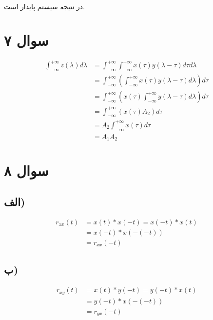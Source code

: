 \documentclass{article}
\begin{document}
	در نتیجه سیستم پایدار است.

	\section*{سوال ۷}

	\begin{align*}
		\int_{-\infty}^{+\infty} z(\lambda) d\lambda
		&= \int_{-\infty}^{+\infty} \int_{-\infty}^{+\infty} x(\tau) y(\lambda - \tau) d\tau d\lambda \\
		&= \int_{-\infty}^{+\infty} \left(\int_{-\infty}^{+\infty} x(\tau) y(\lambda - \tau) d\lambda \right) d\tau \\
		&= \int_{-\infty}^{+\infty} \left(x(\tau) \int_{-\infty}^{+\infty} y(\lambda - \tau) d\lambda \right) d\tau \\
		&= \int_{-\infty}^{+\infty} \left(x(\tau) A_2 \right) d\tau \\
		&= A_2 \int_{-\infty}^{+\infty} x(\tau) d\tau \\
		&= A_1 A_2
	\end{align*}

	\section*{سوال ۸}
	\subsection*{الف)}
	\begin{align*}
		r_{xx}(t) &= x(t) * x(-t) = x(-t) * x(t) \\
		&= x(-t) * x(-(-t)) \\
		&= r_{xx}(-t)
	\end{align*}

	\subsection*{ب)}
	\begin{align*}
		r_{xy}(t) &= x(t) * y(-t) = y(-t) * x(t) \\
		&= y(-t) * x(-(-t)) \\
		&= r_{yx}(-t)
	\end{align*}
\end{document}
